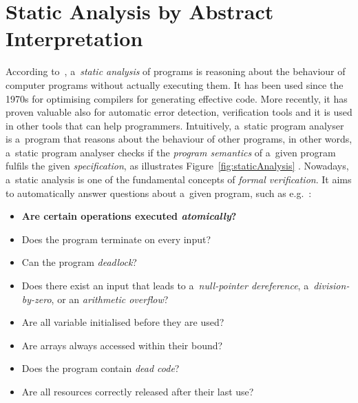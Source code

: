 \section{Static Analysis by Abstract Interpretation}
\label{sec:staticAnalysisAI}

According to~\cite{staticAnalysisMoller}, a~\emph{static analysis} of
programs is reasoning about the behaviour of computer programs without
actually executing them. It has been used since the 1970s for optimising
compilers for generating effective code. More recently, it has proven
valuable also for automatic error detection, verification tools and it
is used in other tools that can help programmers. Intuitively,
a~static program analyser is a~program that reasons about the behaviour
of other programs, in other words, a~static program analyser checks if the
\emph{program semantics} of a~given program fulfils the given
\emph{specification}, as illustrates Figure~\ref{fig:staticAnalysis}
\cite{AIBasedFormalMethodsCousot}. Nowadays, a~static analysis is one of
the fundamental concepts of \emph{formal verification}. It aims to
automatically answer questions about a~given program, such as
e.g.~\cite{staticAnalysisMoller}:
\begin{itemize}
    \item
        \textbf{Are certain operations executed \emph{atomically}?}

    \item
        Does the program terminate on every input?

    \item
        Can the program \emph{deadlock}?

    \item
        Does there exist an input that leads to a~\emph{null-pointer
        dereference}, a~\emph{division-by-zero}, or an \emph{arithmetic
        overflow}?

    \item
        Are all variable initialised before they are used?

    \item
        Are arrays always accessed within their bound?

    \item
        Does the program contain \emph{dead code}?

    \item
        Are all resources correctly released after their last
        use?
\end{itemize}

